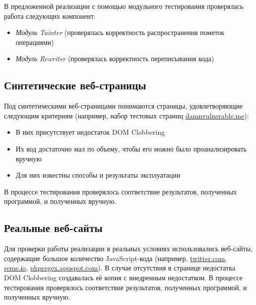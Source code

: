 	В предложенной реализации с помощью модульного тестирования проверялась работа следующих компонент:
	\begin{itemize}
		\item \textit{Модуль Tainter} (проверялась корректность распространения пометок операциями)
		\item \textit{Модуль Rewriter} (проверялась корректность переписывания кода)
	\end{itemize}

\subsection{Синтетические веб-страницы}
	Под синтетическими веб-страницами понимаются страницы, удовлетворяющие следующим критериям (например, набор тестовых страниц  \url{damnvulnerable.me}): 

	\begin{itemize}
		\item В них присутствует недостаток DOM Clobbering
		\item Их код достаточно мал по объему, чтобы его можно было проанализировать вручную
		\item Для них известны способы и результаты эксплуатации
	\end{itemize}


	В процессе тестирования проверялось соответствие результатов, полученных программой, и полученных вручную.

\subsection{Реальные веб-сайты}
	Для проверки работы реализации в реальных условиях использовались веб-сайты, содержащие большое количество JavaScript-кода (например, \url{twitter.com}, \url{reme.io}, \url{phpregex.appspot.com}). В случае отсутствия в странице недостатка DOM Clobbering создавалась её копия с внедренным недостатком. В процессе тестирования проверялось соответствие результатов, полученных программой, и полученных вручную.


